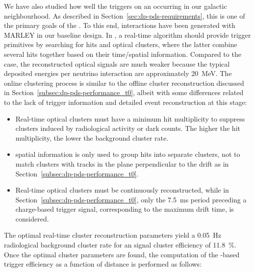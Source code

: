 We have also studied how well the   triggers on an  occurring in our galactic neighbourhood. As described in Section~\ref{sec:dp-pds-requirements}, this is one of the primary goals of the . To this end,  \nue {} interactions have been generated with MARLEY \cite{marley} in our baseline  design. In , a real-time algorithm should provide trigger primitives by searching for  hits and optical clusters, where the latter combine several hits together based on their time/spatial information. Compared to the  case, the reconstructed optical signals are much weaker because the typical deposited energies per  neutrino interaction are approximately \SI{20}{\MeV}. The online clustering process is similar to the offline cluster reconstruction discussed in Section~\ref{subsec:dp-pds-performance_t0}, albeit with some differences related to the lack of trigger information and detailed event reconstruction at this stage:
%
\begin{itemize}
\item Real-time optical clusters must have a minimum hit multiplicity to suppress clusters induced by radiological activity or  dark counts. The higher the hit multiplicity, the lower the background cluster rate.
\item {} spatial information is only used to group hits into separate clusters,  not to match  clusters with  tracks in the plane perpendicular to the drift as in Section~\ref{subsec:dp-pds-performance_t0}.
\item Real-time optical clusters must be continuously reconstructed, while in Section~\ref{subsec:dp-pds-performance_t0}, only the \SI{7.5}{\milli\s} period preceding a charge-based trigger signal, corresponding to the maximum drift time, is considered.
\end{itemize}
%
The optimal real-time cluster reconstruction parameters yield a \SI{0.05}{\Hz} radiological background cluster rate for an  \nue {} signal cluster efficiency of \SI{11.8}{\%}. Once the optimal cluster parameters are found, the computation of the -based  trigger efficiency as a function of  distance is performed as follows:

